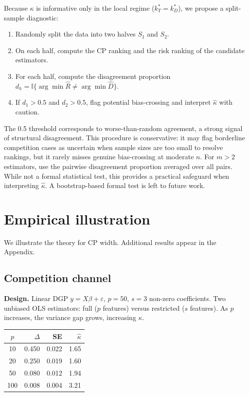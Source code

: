 \documentclass[lineno]{biometrika}
\begin{document}
Because $\kappa$ is informative only in the local regime ($k_T^* = k_D^*$), we propose a split-sample diagnostic:
\begin{enumerate}
\item Randomly split the data into two halves $S_1$ and $S_2$.
\item On each half, compute the CP ranking and the risk ranking of the candidate estimators.
\item For each half, compute the disagreement proportion $d_h = \mathbb{I}\{\arg\min \hat R \neq \arg\min \hat D\}$.
\item If $d_1 > 0.5$ and $d_2 > 0.5$, flag potential bias-crossing and interpret $\hat\kappa$ with caution.
\end{enumerate}
The 0.5 threshold corresponds to worse-than-random agreement, a strong signal of structural disagreement. This procedure is conservative: it may flag borderline competition cases as uncertain when sample sizes are too small to resolve rankings, but it rarely misses genuine bias-crossing at moderate $n$. For $m > 2$ estimators, use the pairwise disagreement proportion averaged over all pairs. While not a formal statistical test, this provides a practical safeguard when interpreting $\hat\kappa$. A bootstrap-based formal test is left to future work.

\section{Empirical illustration}

We illustrate the theory for CP width. Additional results appear in the Appendix.

\subsection{Competition channel}

\textbf{Design.} Linear DGP $y = X\beta + \varepsilon$, $p=50$, $s=3$ non-zero coefficients. Two unbiased OLS estimators: full ($p$ features) versus restricted ($s$ features). As $p$ increases, the variance gap grows, increasing $\kappa$.

\begin{table}
{\begin{tabular}{crrr}
$p$ & $\Delta$ & SE & $\hat\kappa$ \\ \hline
10 & 0.450 & 0.022 & 1.65 \\
20 & 0.250 & 0.019 & 1.60 \\
50 & 0.080 & 0.012 & 1.94 \\
100 & 0.008 & 0.004 & 3.21
\end{tabular}}
\label{tab:comp}
\end{table}
\end{document}
